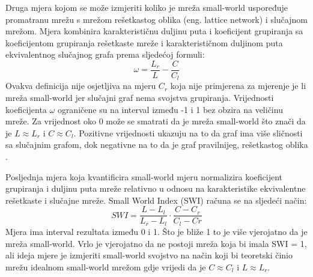 Druga mjera kojom se može izmjeriti koliko je mreža small-world uspoređuje promatranu mrežu s mrežom rešetkastog oblika (eng. lattice network) i slučajnom mrežom. Mjera kombinira karakterističnu duljinu puta i koeficijent grupiranja sa koeficijentom grupiranja rešetkaste mreže i karakterističnom duljinom puta ekvivalentnog slučajnog grafa prema sljedećoj formuli:
\begin{equation}
	\omega = \dfrac{L_{r}}{L} - \dfrac{C}{C_{l}}
\end{equation}
Ovakva definicija nije osjetljiva na mjeru $ C_{r} $ koja nije primjerena za mjerenje je li mreža small-world jer slučajni graf nema svojstva grupiranja. Vrijednosti koeficijenta $\omega$ ograničene su na interval između -1 i 1 bez obzira na veličinu mreže. Za vrijednost oko 0 može se smatrati da je mreža small-world što znači da je $ L \approx L_{r} $ i $ C \approx C_{l} $. Pozitivne vrijednosti ukazuju na to da graf ima više sličnosti sa slučajnim grafom, dok negativne na to da je graf pravilnijeg, rešetkastog oblika \cite{telesford2011ubiquity}.


Posljednja mjera koja kvantificira small-world mjeru normalizira koeficijent grupiranja i duljinu puta mreže relativno u odnosu na karakteristike ekvivalentne rešetkaste i slučajne mreže. Small World Index (SWI) računa se na sljedeći način:
\begin{equation}
	SWI = \dfrac{L - L_{l}}{L_{r} - L_{l}} \cdot \dfrac{C - C_{r}}{C_{l} - C{r}}
\end{equation} 
Mjera ima interval rezultata između 0 i 1. Što je bliže 1 to je više vjerojatno da je mreža small-world. Vrlo je vjerojatno da ne postoji mreža koja bi imala SWI = 1, ali ideja mjere je izmjeriti small-world svojstvo na način koji bi teoretski činio mrežu idealnom small-world mrežom gdje vrijedi da je $ C \approx C_{l} $ i $ L \approx L_{r} $.



